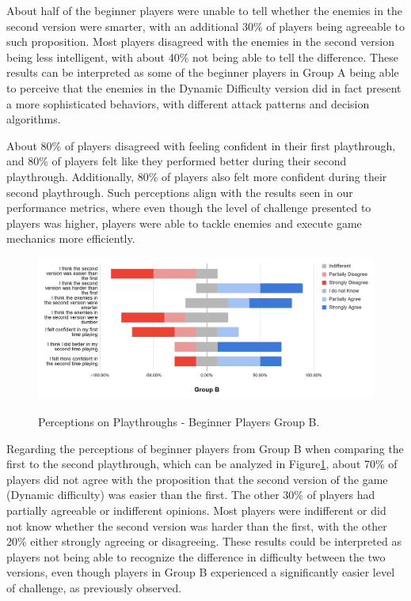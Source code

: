About half of the beginner players were unable to tell whether the enemies in the second version were smarter, with an additional 30\% of players being agreeable to such proposition. Most players disagreed with the enemies in the second version being less intelligent, with about 40\% not being able to tell the difference. These results can be interpreted as some of the beginner players in Group A being able to perceive that the enemies in the Dynamic Difficulty version did in fact present a more sophisticated behaviors, with different attack patterns and decision algorithms.

About 80\% of players disagreed with feeling confident in their first playthrough, and 80\% of players felt like they performed better during their second playthrough. Additionally, 80\% of players also felt more confident during their second playthrough. Such perceptions align with the results seen in our performance metrics, where even though the level of challenge presented to players was higher, players were able to tackle enemies and execute game mechanics more efficiently.

\begin{figure}[ht]
    \begin{center}
    \caption{Perceptions on Playthroughs - Beginner Players Group B.}
        \includegraphics[width=36em]{figures/fig-perception-versions-beginner-players-group-b.png}
        \label{fig:perception-playthrough-beginner-players-group-b}
    \end{center}
\end{figure}

Regarding the perceptions of beginner players from Group B when comparing the first to the second playthrough, which can be analyzed in Figure\ref{fig:perception-playthrough-beginner-players-group-b}, about 70\% of players did not agree with the proposition that the second version of the game (Dynamic difficulty) was easier than the first. The other 30\% of players had partially agreeable or indifferent opinions. Most players were indifferent or did not know whether the second version was harder than the first, with the other 20\% either strongly agreeing or disagreeing. These results could be interpreted as players not being able to recognize the difference in difficulty between the two versions, even though players in Group B experienced a significantly easier level of challenge, as previously observed.


